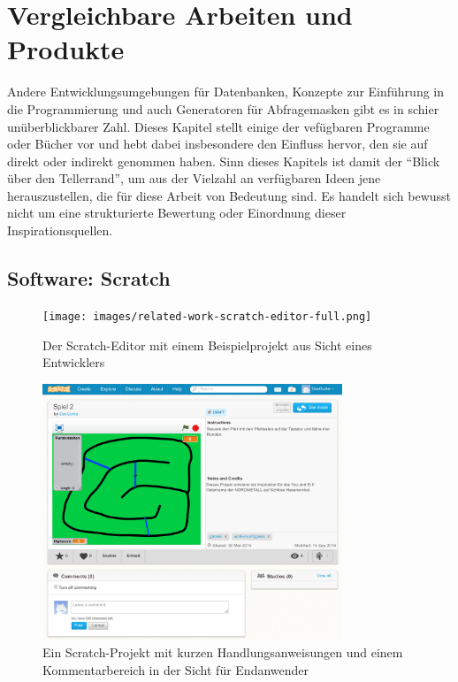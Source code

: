 \section{Vergleichbare Arbeiten und Produkte}
\label{sec:related-work}

Andere Entwicklungsumgebungen für Datenbanken, Konzepte zur Einführung in die Programmierung und auch Generatoren für Abfragemasken gibt es in schier unüberblickbarer Zahl. Dieses Kapitel stellt einige der vefügbaren Programme oder Bücher vor und hebt dabei insbesondere den Einfluss hervor, den sie auf \idename{} direkt oder indirekt genommen haben. Sinn dieses Kapitels ist damit der "`Blick über den Tellerrand"', um aus der Vielzahl an verfügbaren Ideen jene herauszustellen, die für diese Arbeit von Bedeutung sind. Es handelt sich bewusst nicht um eine strukturierte Bewertung oder Einordnung dieser Inspirationsquellen.

\newpage

\subsection{Software: Scratch}

\begin{figure}[p]
  \centering \texttt{[image: images/related-work-scratch-editor-full.png]}
  \caption{Der Scratch-Editor mit einem Beispielprojekt aus Sicht eines Entwicklers}
  \label{fig:scratch-editor-full}
\end{figure}

\begin{figure}[p]
  \centering \includegraphics[width=0.8\textwidth]{images/related-work-scratch-project-full.png}
  \caption{Ein Scratch-Projekt mit kurzen Handlungsanweisungen und einem Kommentarbereich in der Sicht für Endanwender}
  \label{fig:scratch-enduser-full}
\end{figure}

